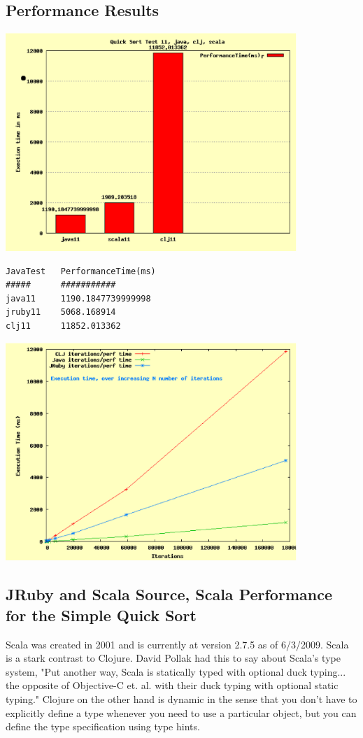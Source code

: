 \subsection{Performance Results}

\includegraphics[width=110mm]{chart1_scala_8.eps}
\begin{verbatim}
JavaTest   PerformanceTime(ms)
#####      ########### 
java11     1190.1847739999998              
jruby11    5068.168914            
clj11      11852.013362
\end{verbatim}

\includegraphics[width=110mm]{line_clj_sort_6.eps}

\subsection{JRuby and Scala Source, Scala Performance for the Simple Quick Sort}

Scala was created in 2001 and is currently at version 2.7.5 as of 6/3/2009. Scala is a stark contrast to Clojure. David Pollak had this to say about Scala's type system, "Put another way, Scala is statically typed with optional duck typing... the opposite of Objective-C et. al. with their duck typing with optional static typing." Clojure on the other hand is dynamic in the sense that you don't have to explicitly define a type whenever you need to use a particular object, but you can define the type specification using type hints.

